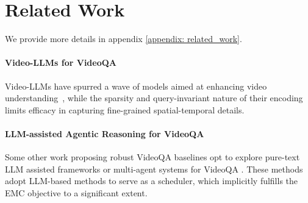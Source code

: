 \section{Related Work} %
We provide more details in appendix \ref{appendix: related_work}.
\paragraph{Video-LLMs for VideoQA}
Video-LLMs have spurred a wave of models aimed at enhancing video understanding~\citep{lin2023video, Ma_2024_CVPR, 10658165, Li2023LLaMAVIDAI, liu2024llavanext, Xu2024PLLaVAP}, while the sparsity and query-invariant nature of their encoding limits efficacy in capturing fine-grained spatial-temporal details.

\paragraph{LLM-assisted Agentic Reasoning for VideoQA}
Some other work proposing robust VideoQA baselines opt to explore pure-text LLM assisted frameworks or multi-agent systems for VideoQA \citep{wang2024videotreeadaptivetreebasedvideo, shang-etal-2024-traveler, VideoAgent}. These methods adopt LLM-based methods to serve as a scheduler, which implicitly fulfills the EMC objective to a significant extent.

